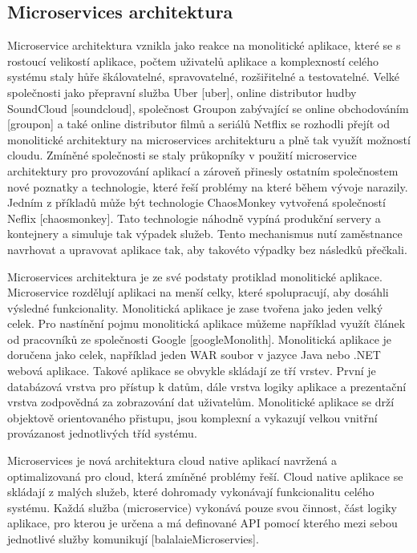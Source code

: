 \subsection{Microservices architektura}
Microservice architektura vznikla jako reakce na monolitické aplikace, které se s rostoucí velikostí aplikace, počtem uživatelů aplikace a komplexností celého systému staly hůře škálovatelné, spravovatelné, rozšiřitelné a testovatelné. Velké společnosti jako přepravní služba Uber [uber], online distributor hudby SoundCloud [soundcloud], společnost Groupon zabývající se online obchodováním [groupon] a také online distributor filmů a seriálů Netflix se rozhodli přejít od monolitické architektury na microservices architekturu a plně tak využít možností cloudu. Zmíněné společnosti se staly průkopníky v použití microservice architektury pro provozování aplikací a zároveň přinesly ostatním společnostem nové poznatky a technologie, které řeší problémy na které během vývoje narazily. Jedním z příkladů může být technologie ChaosMonkey vytvořená společností Neflix [chaosmonkey]. Tato technologie náhodně vypíná produkční servery a kontejnery a simuluje tak výpadek služeb. Tento mechanismus nutí zaměstnance navrhovat a upravovat aplikace tak, aby takovéto výpadky bez následků přečkali.\par
Microservices architektura je ze své podstaty protiklad monolitické aplikace. Microservice rozdělují aplikaci na menší celky, které spolupracují, aby dosáhli výsledné funkcionality. Monolitická aplikace je zase tvořena jako jeden velký celek. Pro nastínění pojmu monolitická aplikace můžeme například využít článek od pracovníků ze společnosti Google [googleMonolith]. Monolitická aplikace je doručena jako celek, například jeden WAR soubor v jazyce Java nebo .NET webová aplikace. Takové aplikace se obvykle skládají ze tří vrstev. První je databázová vrstva pro přístup k datům, dále vrstva logiky aplikace a prezentační vrstva zodpovědná za zobrazování dat uživatelům. Monolitické aplikace se drží objektově orientovaného přistupu, jsou komplexní a vykazují velkou vnitřní provázanost jednotlivých tříd systému. \par
Microservices je nová architektura cloud native aplikací navržená a optimalizovaná pro cloud, která zmíněné problémy řeší. Cloud native aplikace se skládají z malých služeb, které dohromady vykonávají funkcionalitu celého systému. Každá služba (microservice) vykonává pouze svou činnost, část logiky aplikace, pro kterou je určena a má definované API pomocí kterého mezi sebou jednotlivé služby komunikují [balalaieMicroservies]. \par

